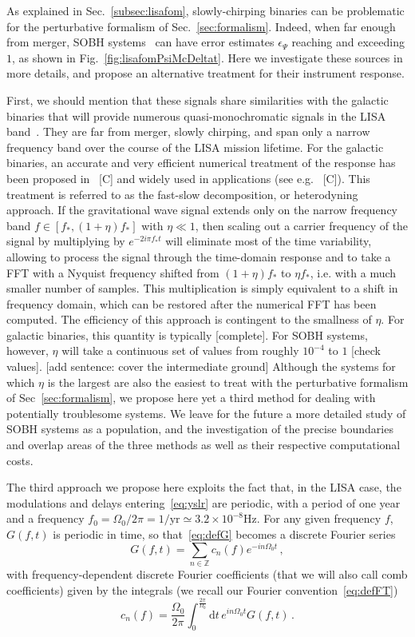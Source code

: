 \documentclass[aps,showpacs,twocolumn,
prd,superscriptaddress,nofootinbib]{revtex4-1}
\newcommand{\be}{\begin{equation}}
\newcommand{\ee}{\end{equation}}
\newcommand\ud{{\mathrm{d}}}
\newcommand{\SM}[1]{{\color{Red} #1}}
\begin{document}
As explained in Sec.~\ref{subsec:lisafom}, slowly-chirping binaries can be problematic for the perturbative formalism of Sec.~\ref{sec:formalism}. Indeed, when far enough from merger, SOBH systems~\cite{Sesana16} can have error estimates $\epsilon_{\Psi}$ reaching and exceeding $1$, as shown in Fig.~\ref{fig:lisafomPsiMcDeltat}. Here we investigate these sources in more details, and propose an alternative treatment for their instrument response.

First, we should mention that these signals share similarities with the galactic binaries that will provide numerous quasi-monochromatic signals in the LISA band~\cite{LISA17}. They are far from merger, slowly chirping, and span only a narrow frequency band over the course of the LISA mission lifetime. For the galactic binaries, an accurate and very efficient numerical treatment of the response has been proposed in~\cite{} \SM{[C]} and widely used in applications (see e.g.~\cite{} \SM{[C]}). This treatment is referred to as the fast-slow decomposition, or heterodyning approach. If the gravitational wave signal extends only on the narrow frequency band $f \in [f_{*}, (1+\eta) f_{*}]$ with $\eta \ll 1$, then scaling out a carrier frequency of the signal by multiplying by $e^{-2 i \pi f_{*} t}$ will eliminate most of the time variability, allowing to process the signal through the time-domain response and to take a FFT with a Nyquist frequency shifted from $(1+\eta) f_{*}$ to $\eta f_{*}$, i.e. with a much smaller number of samples. This multiplication is simply equivalent to a shift in frequency domain, which can be restored after the numerical FFT has been computed. The efficiency of this approach is contingent to the smallness of $\eta$. For galactic binaries, this quantity is typically \SM{[complete]}. For SOBH systems, however, $\eta$ will take a continuous set of values from roughly $10^{-4}$ to $1$ \SM{[check values]}. \SM{[add sentence: cover the intermediate ground]} Although the systems for which $\eta$ is the largest are also the easiest to treat with the perturbative formalism of Sec~\ref{sec:formalism}, we propose here yet a third method for dealing with potentially troublesome systems. We leave for the future a more detailed study of SOBH systems as a population, and the investigation of the precise boundaries and overlap areas of the three methods as well as their respective computational costs.

The third approach we propose here exploits the fact that, in the LISA case, the modulations and delays entering~\eqref{eq:yslr} are periodic, with a period of one year and a frequency $f_{0} = \Omega_{0}/2\pi = 1/\mathrm{yr} \simeq 3.2\times 10^{-8}\mathrm{Hz}$. For any given frequency $f$, $G(f,t)$ is periodic in time, so that~\eqref{eq:defG} becomes a discrete Fourier series
\be\label{eq:Gdiscretefourier}
	G(f,t) = \sum_{n \in \mathbb{Z}} c_{n}(f) e^{-in\Omega_{0}t} \,,
\ee
with frequency-dependent discrete Fourier coefficients (that we will also call comb coefficients) given by the integrals (we recall our Fourier convention~\eqref{eq:defFT})
\be\label{eq:defcn}
	c_{n}(f) = \frac{\Omega_{0}}{2\pi} \int_{0}^{\frac{2\pi}{\Omega_{0}}} \ud t \, e^{i n \Omega_{0} t} G(f,t) \,.
\ee
\end{document}
